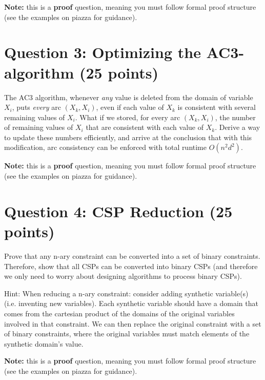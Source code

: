 \documentclass[11pt]{article}
\newcommand{\question}[1]{\section*{\normalsize #1}}
\begin{document}
\noindent\textbf{Note:} this is a \textbf{proof} question, meaning you must follow formal proof structure (see the examples on piazza for guidance).
\newpage











\question{Question 3: Optimizing the AC3-algorithm (25 points)}
The AC3 algorithm, whenever \textit{any} value is deleted from the domain of variable $X_i$, puts \textit{every} arc $(X_k, X_i)$, even if each value of $X_k$ is consistent with several remaining values of $X_i$. What if we stored, for every arc $(X_k, X_i)$, the number of remaining values of $X_i$ that are consistent with each value of $X_k$. Derive a way to update these numbers efficiently, and arrive at the conclusion that with this modification, arc consistency can be enforced with total runtime $O(n^2d^2)$.\newline

\noindent\textbf{Note:} this is a \textbf{proof} question, meaning you must follow formal proof structure (see the examples on piazza for guidance).\newpage














\question{Question 4: CSP Reduction (25 points)}
Prove that any n-ary constraint can be converted into a set of binary constraints. Therefore, show that all CSPs can be converted into binary CSPs (and therefore we only need to worry about designing algorithms to process binary CSPs).\newline\newline\newline

\noindent Hint: When reducing a n-ary constraint: consider adding synthetic variable(s) (i.e. inventing new variables). Each synthetic variable should have a domain that comes from the cartesian product of the domains of the original variables involved in that constraint. We can then replace the original constraint with a set of binary constraints, where the original variables must match elements of the synthetic domain's value.\newline

\noindent\textbf{Note:} this is a \textbf{proof} question, meaning you must follow formal proof structure (see the examples on piazza for guidance).
\newpage
\end{document}

